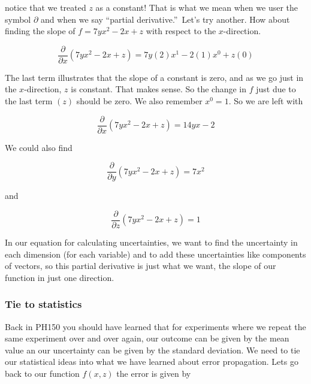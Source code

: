 notice that we treated $z$ as a constant! That is what we mean when we user the symbol $\partial $ and when we say \textquotedblleft partial derivative.\textquotedblright\ Let's try another. How about finding the slope of $f=7yx^{2}-2x+z$ with respect to the $x$-direction.

\begin{equation*}
   \frac{\partial }{\partial x}\left( 7yx^{2}-2x+z\right) =7y\left( 2\right)x^{1}-2(1)x^{0}+z\left( 0\right)
\end{equation*}

The last term illustrates that the slope of a constant is zero, and as we go just in the $x$-direction, $z$ is constant. That makes sense. So the change in $f$ just due to the last term $(z)$ should be zero. We also remember $x^{0}=1.$ So we are left with 

\begin{equation*}
	\frac{\partial }{\partial x}\left( 7yx^{2}-2x+z\right) =14yx-2
\end{equation*}

We could also find 

\begin{equation*}
	\frac{\partial }{\partial y}\left( 7yx^{2}-2x+z\right) =7x^{2}
\end{equation*}

and

\begin{equation*}
	\frac{\partial }{\partial z}\left( 7yx^{2}-2x+z\right) =1
\end{equation*}

In our equation for calculating uncertainties, we want to find the uncertainty in each dimension (for each variable) and to add these uncertainties like components of vectors, so this partial derivative is just what we want, the slope of our function in just one direction.

\subsubsection{Tie to statistics}

Back in PH150 you should have learned that for experiments where we repeat the same experiment over and over again, our outcome can be given by the mean value an our uncertainty can be given by the standard deviation. We need to tie our statistical ideas into what we have learned about error propagation. Lets go back to our function $f\left( x,z\right) $ the error is given by 

